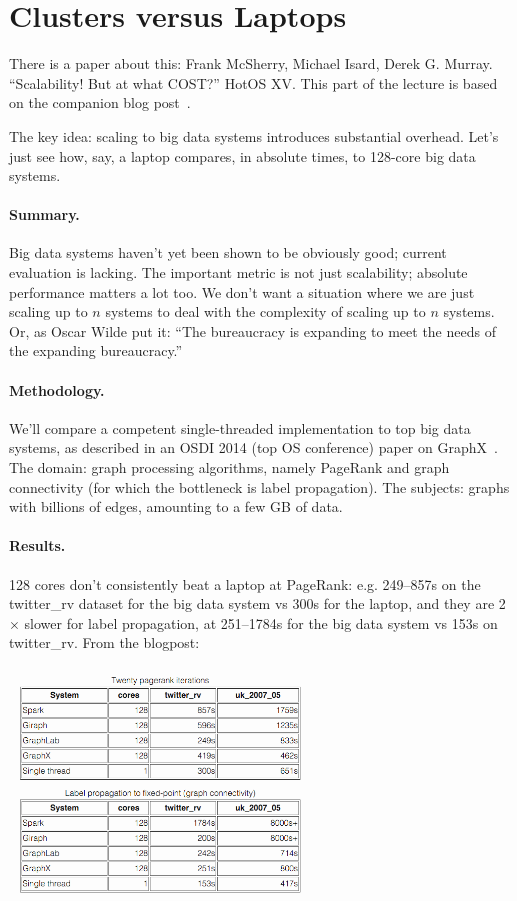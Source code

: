 \documentclass[a4paper]{report}
\begin{document}
\section*{Clusters versus Laptops}
There is a paper about this: Frank McSherry, Michael Isard, Derek G. Murray. ``Scalability! But at what COST?'' HotOS XV. This part of the lecture is based on the companion blog post~\cite{scalecost}.

The key idea: scaling to big data systems introduces substantial overhead. Let's just see how, say, a laptop compares, in absolute times, to 128-core big data systems.

\paragraph{Summary.} Big data systems haven't yet been shown to be obviously good; current evaluation is lacking.
The important metric is not just scalability; absolute
performance matters a lot too. We don't want a situation where we are just scaling up to $n$ systems to deal with the complexity of scaling up to $n$ systems. Or, as Oscar Wilde put it: ``The bureaucracy is expanding to meet the needs of the expanding bureaucracy.''

\paragraph{Methodology.} We'll compare a competent single-threaded implementation to top
big data systems, as described in an OSDI 2014 (top OS conference) paper on GraphX~\cite{graphx}. The domain: graph processing
algorithms, namely PageRank and graph connectivity (for which the bottleneck is label propagation). The subjects: graphs with billions of edges, amounting to a few
GB of data.

\paragraph{Results.} 128 cores don't consistently beat a laptop at PageRank: e.g. 249--857s on the twitter\_rv dataset for the big data system vs 300s for the laptop, and they are 2$\times$ slower for label
propagation, at 251--1784s for the big data system vs 153s on
twitter\_rv. From the blogpost:

\begin{center}
	\includegraphics[width=0.60\textwidth]{images/pagerank.png}
\end{center}
\end{document}
